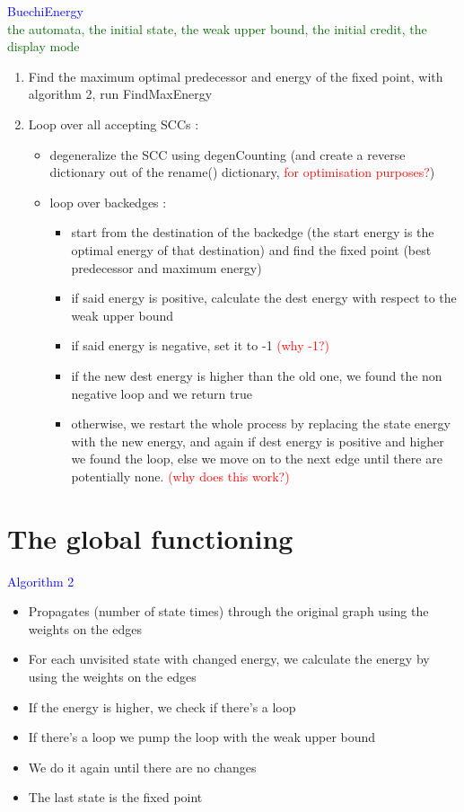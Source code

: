 \documentclass{rapport}
\begin{document}
\textcolor{blue}{BuechiEnergy}\\
\textcolor[HTML]{006400}{the automata, the initial state, the weak upper bound, the initial credit, the display mode}
\begin{enumerate}
    \item Find the maximum optimal predecessor and energy of the fixed point, with algorithm 2, run FindMaxEnergy
    \item Loop over all accepting SCCs :
    \begin{itemize}
        \item degeneralize the SCC using degenCounting (and create a reverse dictionary out of the rename() dictionary, \textcolor{red}{for optimisation purposes?})
        \item loop over backedges :
        \begin{itemize}
            \item start from the destination of the backedge (the start energy is the optimal energy of that destination) and find the fixed point (best predecessor and maximum energy)
            \item if said energy is positive, calculate the dest energy with respect to the weak upper bound
            \item if said energy is negative, set it to -1 \textcolor{red}{(why -1?)}
            \item if the new dest energy is higher than the old one, we found the non negative loop and we return true
            \item otherwise, we restart the whole process by replacing the state energy with the new energy, and again if dest energy is positive and  higher we found the loop, else we move on to the next edge until there are potentially none. \textcolor{red}{(why does this work?)}
        \end{itemize}
    \end{itemize}
\end{enumerate}

\newpage

\section{The global functioning}

\textcolor{blue}{Algorithm 2}\\
\begin{itemize}
    \item Propagates (number of state times) through the original graph using the weights on the edges
    \item For each unvisited state with changed energy, we calculate the energy by using the weights on the edges
    \item If the energy is higher, we check if there’s a loop
    \item If there’s a loop we pump the loop with the weak upper bound
    \item We do it again until there are no changes
    \item The last state is the fixed point
\end{itemize}
\end{document}
